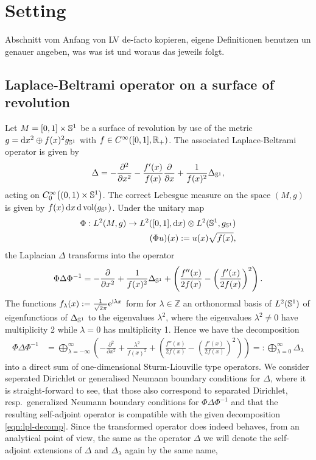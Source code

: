 \section{Setting}
Abschnitt vom Anfang von LV de-facto kopieren, eigene Definitionen benutzen un
genauer angeben, was was ist und woraus das jeweils folgt.

\subsection{Laplace-Beltrami operator on a surface of revolution}
Let $M = [0,1]\times\Sphere{1}$ be a surface of revolution by use of the metric
$g = \mathrm dx^2 \oplus f(x)^2 g_\Sphere{1}$ with $f\in \Cinf([0,1],
\Rplus)$. The associated Laplace-Beltrami operator is given by
\begin{align}
  \Delta = -\frac{\partial^2}{\partial x^2} -
            \frac{f'(x)}{f(x)}\frac{\partial}{\partial x} +
            \frac{1}{f(x)^2}\Delta_\Sphere1,
\end{align}
acting on $\Cinf[0]\bigl((0,1)\times\Sphere1\bigr)$. The correct Lebesgue
measure on the space $(M,g)$ is given by $f(x)\,\mathrm dx\, \mathrm
d\vol(g_\Sphere1)$. Under the unitary map
\begin{align*}
  \Phi: L^2(M, g)\to L^2([0,1], \mathrm dx)\otimes L^2(\Sphere1, g_\Sphere1) \\
  (\Phi u)(x) := u(x) \sqrt{f(x)},
\end{align*}
the Laplacian $\Delta$ transforms into the operator
\begin{align*}
  \Phi\Delta\Phi^{-1} = -\frac{\partial}{\partial x^2} +
  \frac{1}{f(x)^2}\Delta_\Sphere1 + \left( \frac{f''(x)}{2f(x)} -
  \left(\frac{f'(x)}{2f(x)}\right)^2\right).
\end{align*}
The functions $f_\lambda(x) := \frac{1}{\sqrt{2\pi}}\Eto{\mathrm i\lambda x}$
form for $\lambda\in\mathbb{Z}$ an orthonormal basis of $L^2(\Sphere1)$ of
eigenfunctions of $\Delta_\Sphere1$ to the eigenvalues $\lambda^2$, where the
eigenvalues $\lambda^2 \neq 0$ have multiplicity 2 while $\lambda = 0$ has
multiplicity 1. Hence we have the decomposition
\begin{align}
  \label{eqn:lpl-decomp}
  \Phi\Delta\Phi^{-1} &= \bigoplus_{\lambda=-\infty}^{\infty} \left(
    -\frac{\partial^2}{\partial x^2} + \frac{\lambda^2}{f(x)^2} + 
     \left( \frac{f''(x)}{2f(x)} -
     \left(\frac{f'(x)}{2f(x)}\right)^2\right)\right)
     =: \bigoplus_{\lambda=0}^{\infty}\Delta_\lambda
\end{align}
into a direct sum of one-dimensional Sturm-Liouville type operators. We consider
seperated Dirichlet or generalised Neumann boundary conditions for $\Delta$,
where it is straight-forward to see, that those also correspond to separated
Dirichlet, resp.\ generalized Neumann boundary conditions for
$\Phi\Delta\Phi^{-1}$ and that the resulting self-adjoint operator is compatible
with the given decomposition \eqref{eqn:lpl-decomp}. Since the transformed
operator does indeed behaves, from an analytical point of view, the same as the
operator $\Delta$ we will denote the self-adjoint extensions of $\Delta$ and
$\Delta_\lambda$ again by the same name, %

